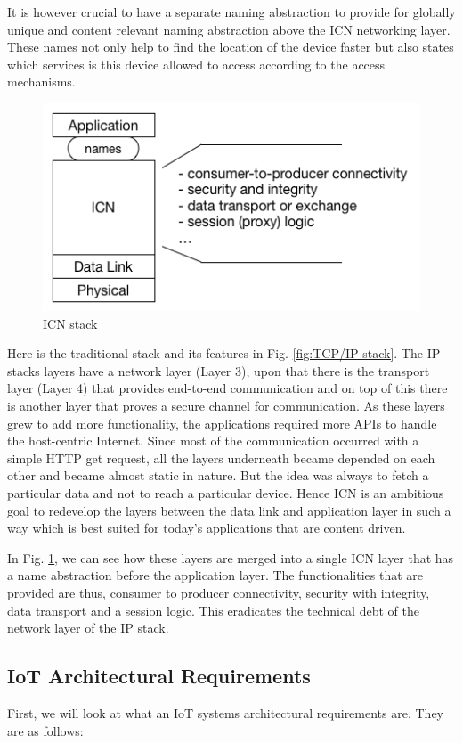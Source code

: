 It is however crucial to have a separate naming abstraction to provide for globally unique and content relevant naming abstraction above the ICN networking layer. These names not only help to find the location of the device faster but also states which services is this device allowed to access according to the access mechanisms. 

 \begin{figure}[h]
	\centering
	\includegraphics[width=0.8\linewidth]{Figures/stack.png}
	\caption[]{ICN stack}
	\label{fig:stack}
\end{figure}
Here is the traditional stack and its features in Fig. \ref{fig:TCP/IP stack}. 
The IP stacks layers have a network layer (Layer 3), upon that there is the transport layer (Layer 4) that provides end-to-end communication and on top of this there is another layer that proves a secure channel for communication.  As these layers grew to add more functionality, the applications required more APIs to handle the host-centric Internet. Since most of the communication occurred with a simple HTTP get request, all the layers underneath became depended on each other and became almost static in nature. But the idea was always to fetch a particular data and not to reach a particular device. Hence ICN is an ambitious goal to redevelop the layers between the data link and application layer in such a way which is best suited for today's applications that are content driven.\par
In Fig. \ref{fig:stack}, we can see how these layers are merged into a single ICN layer that has a name abstraction before the application layer. The functionalities that are provided are thus, consumer to producer connectivity, security with integrity, data transport and a session logic. This eradicates the technical debt of the network layer of the IP stack.

\subsection{IoT Architectural Requirements}
\label{subsec: IoT Architectural Requirements}
First, we will look at what an IoT systems architectural requirements are. They are as follows:

